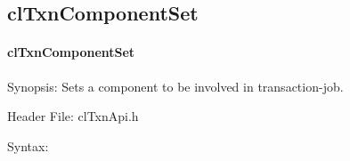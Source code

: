 \begin{flushleft}
\subsection{clTxnComponentSet}
\hypertarget{pagetxn109}{}\paragraph{cl\-Txn\-Component\-Set}\label{pagetxn109}
\begin{Desc}
\item[Synopsis:]Sets a component to be involved in transaction-job.\end{Desc}
\begin{Desc}
\item[Header File:]clTxnApi.h\end{Desc}
\begin{Desc}
\item[Syntax:]


\end{Desc}
\end{flushleft}
